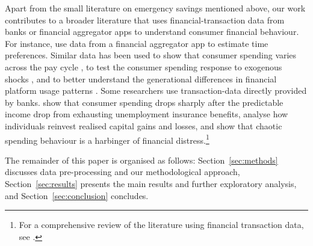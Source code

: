 Apart from the small literature on emergency savings mentioned above, our work
contributes to a broader literature that uses financial-transaction data
from banks or financial aggregator apps to understand consumer financial
behaviour. For instance, \citet{kuchler2020sticking} use data from a
financial aggregator app to estimate time preferences. Similar data has been
used to show that consumer spending varies across the pay cycle
\citep{gelman2014harnessing,olafsson2018liquid}, to test the consumer spending
response to exogenous shocks \citep{baker2018debt,baugh2014disentangling}, and
to better understand the generational differences in financial platform usage
patterns \citep{carlin2019generational}. Some researchers use transaction-data
directly provided by banks. \citet{ganong2019consumer} show that consumer
spending drops sharply after the predictable income drop from exhausting
unemployment insurance benefits, \citet{meyer2018fully} analyse how individuals
reinvest realised capital gains and losses, and \citet{muggleton2020evidence}
show that chaotic spending behaviour is a harbinger of financial
distress.\footnote{For a comprehensive review of the literature using financial
transaction data, see \citet{baker2022household}.}

The remainder of this paper is organised as follows: Section~\ref{sec:methods}
discusses data pre-processing and our methodological approach,
Section~\ref{sec:results} presents the main results and further exploratory
analysis, and Section~\ref{sec:conclusion} concludes.

